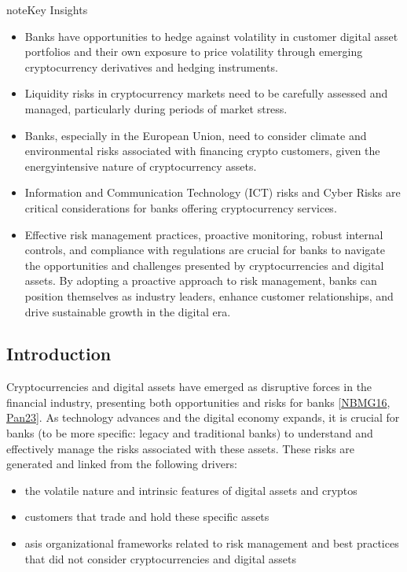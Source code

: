 \documentclass[letterpaper,10pt,english]{jupyterBook}
\begin{document}
\begin{sphinxadmonition}{note}{Key Insights}
\begin{itemize}
\item {} 
\sphinxAtStartPar
Banks have opportunities to hedge against volatility in customer digital asset portfolios and their own exposure to price volatility through emerging cryptocurrency derivatives and hedging instruments.

\item {} 
\sphinxAtStartPar
Liquidity risks in cryptocurrency markets need to be carefully assessed and managed, particularly during periods of market stress.

\item {} 
\sphinxAtStartPar
Banks, especially in the European Union, need to consider climate and environmental risks associated with financing crypto customers, given the energy\sphinxhyphen{}intensive nature of cryptocurrency assets.

\item {} 
\sphinxAtStartPar
Information and Communication Technology (ICT) risks and Cyber Risks are critical considerations for banks offering cryptocurrency services.

\item {} 
\sphinxAtStartPar
Effective risk management practices, proactive monitoring, robust internal controls, and compliance with regulations are crucial for banks to navigate the opportunities and challenges presented by cryptocurrencies and digital assets. By adopting a proactive approach to risk management, banks can position themselves as industry leaders, enhance customer relationships, and drive sustainable growth in the digital era.

\end{itemize}
\end{sphinxadmonition}


\subsection{Introduction}
\label{\detokenize{ARM/arm:introduction}}
\sphinxAtStartPar
Cryptocurrencies and digital assets have emerged as disruptive forces in the financial industry, presenting both opportunities and risks for banks {[}\hyperlink{cite.ARM/arm:id144}{NBMG16}, \hyperlink{cite.ARM/arm:id145}{Pan23}{]}.
As technology advances and the digital economy expands, it is crucial for banks (to be more specific: legacy and traditional banks) to understand and effectively manage the risks associated with these assets. These risks are generated and linked from the following drivers:
\begin{itemize}
\item {} 
\sphinxAtStartPar
the volatile nature and intrinsic features of digital assets and cryptos

\item {} 
\sphinxAtStartPar
customers that trade and hold these specific assets

\item {} 
\sphinxAtStartPar
as\sphinxhyphen{}is organizational frameworks related to risk management and best practices that did not consider cryptocurrencies and digital assets

\end{itemize}
\end{document}

